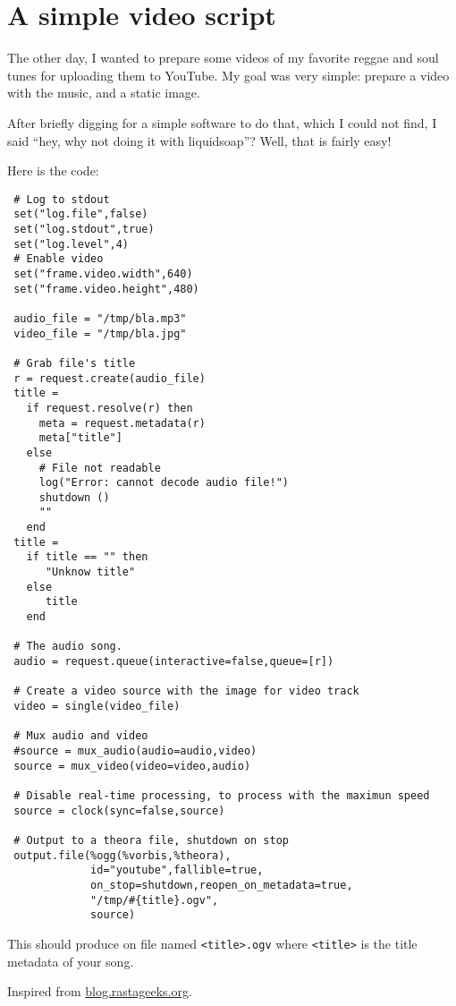 \section{A simple video script}
The other day, I wanted to prepare some videos of my favorite reggae and soul 
tunes for uploading them to YouTube.
My goal was very simple: prepare a video with the music,
and a static image.

After briefly digging for a simple software to do that,
which I could not find, I said ``hey, why not doing it with liquidsoap''?
Well, that is fairly easy!

Here is the code:

\begin{verbatim}
 # Log to stdout
 set("log.file",false)
 set("log.stdout",true)
 set("log.level",4)
 # Enable video
 set("frame.video.width",640)
 set("frame.video.height",480)

 audio_file = "/tmp/bla.mp3"
 video_file = "/tmp/bla.jpg"

 # Grab file's title
 r = request.create(audio_file)
 title = 
   if request.resolve(r) then
     meta = request.metadata(r)
     meta["title"]
   else
     # File not readable
     log("Error: cannot decode audio file!")
     shutdown () 
     ""
   end
 title = 
   if title == "" then
      "Unknow title"
   else
      title
   end

 # The audio song.
 audio = request.queue(interactive=false,queue=[r])

 # Create a video source with the image for video track
 video = single(video_file)

 # Mux audio and video
 #source = mux_audio(audio=audio,video)
 source = mux_video(video=video,audio)

 # Disable real-time processing, to process with the maximun speed
 source = clock(sync=false,source)

 # Output to a theora file, shutdown on stop
 output.file(%ogg(%vorbis,%theora),
             id="youtube",fallible=true,
             on_stop=shutdown,reopen_on_metadata=true,
             "/tmp/#{title}.ogv",
             source)
\end{verbatim}
This should produce on file named \verb+<title>.ogv+ where \verb+<title>+ is the title
metadata of your song.

Inspired from \href{http://blog.rastageeks.org/spip.php?article27}{blog.rastageeks.org}.

